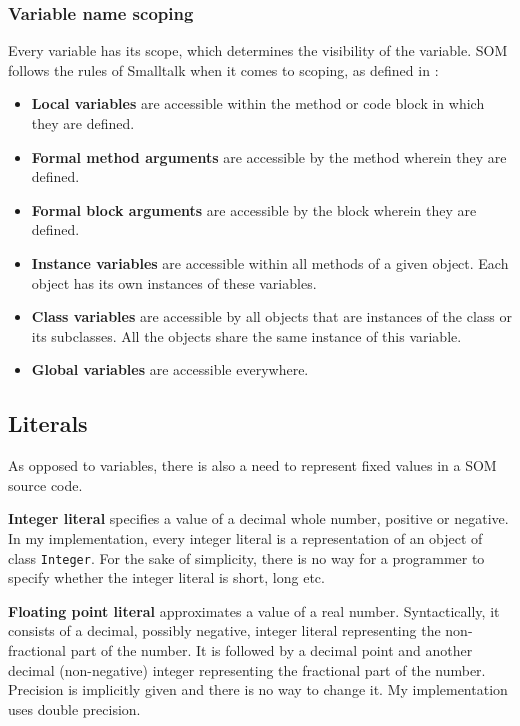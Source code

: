 \documentclass[thesis=M,english]{FITthesis}[2019/12/23]
\begin{document}
\subsubsection{Variable name scoping}
Every variable has its scope, which determines the visibility of the variable. SOM follows the rules of Smalltalk
when it comes to scoping, as defined in \cite{smalltalk-essentials}:

\begin{itemize}
	\item \textbf{Local variables} are accessible within the method or code block in which they are defined.
	\item \textbf{Formal method arguments} are accessible by the method wherein they are defined.
	\item \textbf{Formal block arguments} are accessible by the block wherein they are defined.
	\item \textbf{Instance variables} are accessible within all methods of a given object. Each object
		has its own instances of these variables.
	\item \textbf{Class variables} are accessible by all objects that are instances of the class or its
		subclasses. All the objects share the same instance of this variable.
	\item \textbf{Global variables} are accessible everywhere.
\end{itemize}

\subsection{Literals}
As opposed to variables, there is also a need to represent fixed values in a SOM source code. 

\textbf{Integer literal} specifies a value of a decimal whole number, positive or negative.
In my implementation, every integer literal is a representation of an object of class \texttt{Integer}. 
For the sake of simplicity, there is no way for a programmer to specify whether the integer literal
is short, long etc. 

\textbf{Floating point literal} approximates a value of a real number. Syntactically, it consists of
a decimal, possibly negative, integer literal representing the non-fractional part of the number. It is
followed by a decimal point and another decimal (non-negative) integer representing the fractional part
of the number. Precision is implicitly given and there is no way to change it. My implementation uses
double precision.
\end{document}
